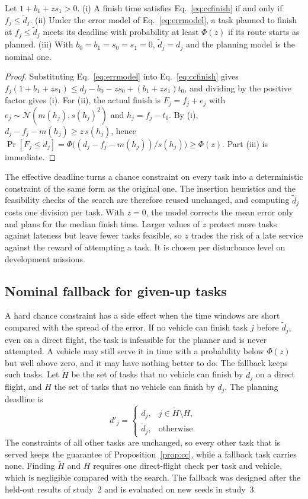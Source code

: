 \begin{prop}\label{prop:cc}
Let $1+b_1+z s_1>0$. (i) A finish time satisfies Eq.~\eqref{eq:ccfinish} if and only if $f_j\le\tilde d_j$. (ii) Under
the error model of Eq.~\eqref{eq:errmodel}, a task planned to finish at $f_j\le\tilde d_j$ meets its deadline with
probability at least $\Phi(z)$ if its route starts as planned. (iii) With $b_0=b_1=s_0=s_1=0$, $\tilde d_j=d_j$ and the
planning model is the nominal one.
\end{prop}
\begin{proof}
Substituting Eq.~\eqref{eq:errmodel} into Eq.~\eqref{eq:ccfinish} gives
$f_j(1+b_1+zs_1)\le d_j-b_0-zs_0+(b_1+zs_1)t_0$, and dividing by the positive factor gives (i). For (ii), the actual
finish is $F_j=f_j+e_j$ with $e_j\sim\mathcal{N}(m(h_j),s(h_j)^2)$ and $h_j=f_j-t_0$. By (i),
$d_j-f_j-m(h_j)\ge z\,s(h_j)$, hence $\Pr[F_j\le d_j]=\Phi\big((d_j-f_j-m(h_j))/s(h_j)\big)\ge\Phi(z)$. Part (iii) is
immediate.
\end{proof}

The effective deadline turns a chance constraint on every task into a deterministic constraint of the same form as the
original one. The insertion heuristics and the feasibility checks of the search are therefore reused unchanged, and
computing $\tilde d_j$ costs one division per task. With $z=0$, the model corrects the mean error only and plans for the
median finish time. Larger values of $z$ protect more tasks against lateness but leave fewer tasks feasible, so $z$
trades the risk of a late service against the reward of attempting a task. It is chosen per disturbance level on
development missions.

\subsection{Nominal fallback for given-up tasks}\label{sec:fallback}
A hard chance constraint has a side effect when the time windows are short compared with the spread of the error. If no
vehicle can finish task $j$ before $\tilde d_j$, even on a direct flight, the task is infeasible for the planner and is
never attempted. A vehicle may still serve it in time with a probability below $\Phi(z)$ but well above zero, and it may
have nothing better to do. The fallback keeps such tasks. Let $\tilde H$ be the set of tasks that no vehicle can finish
by $\tilde d_j$ on a direct flight, and $H$ the set of tasks that no vehicle can finish by $d_j$. The planning deadline is
\begin{equation}\label{eq:fallback}
d'_j=\begin{cases} d_j, & j\in\tilde H\setminus H,\\ \tilde d_j, & \text{otherwise.}\end{cases}
\end{equation}
The constraints of all other tasks are unchanged, so every other task that is served keeps the guarantee of
Proposition~\ref{prop:cc}, while a fallback task carries none. Finding $\tilde H$ and $H$ requires one direct-flight
check per task and vehicle, which is negligible compared with the search. The fallback was designed after the held-out
results of study~2 and is evaluated on new seeds in study~3.

